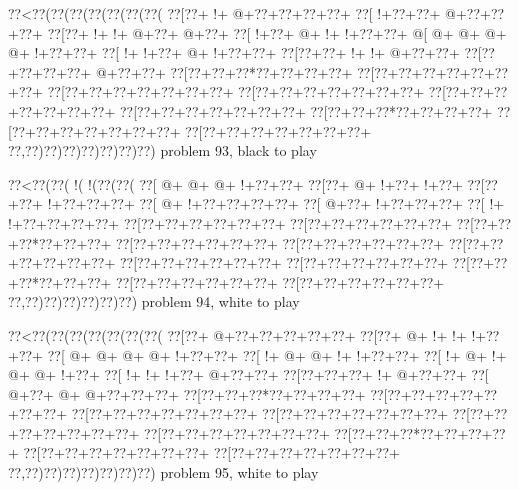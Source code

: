 \vbox{\vbox{\goo
\0??<\0??(\0??(\0??(\0??(\0??(\0??(\0??(
\0??[\0??+\- !+\- @+\0??+\0??+\0??+\0??+
\0??[\- !+\0??+\0??+\- @+\0??+\0??+\0??+
\0??[\0??+\- !+\- !+\- @+\0??+\- @+\0??+
\0??[\- !+\0??+\- @+\- !+\- !+\0??+\0??+
\- @[\- @+\- @+\- @+\- @+\- !+\0??+\0??+
\0??[\- !+\- !+\0??+\- @+\- !+\0??+\0??+
\0??[\0??+\0??+\- !+\- !+\- @+\0??+\0??+
\0??[\0??+\0??+\0??+\0??+\- @+\0??+\0??+
\0??[\0??+\0??+\0??*\0??+\0??+\0??+\0??+
\0??[\0??+\0??+\0??+\0??+\0??+\0??+\0??+
\0??[\0??+\0??+\0??+\0??+\0??+\0??+\0??+
\0??[\0??+\0??+\0??+\0??+\0??+\0??+\0??+
\0??[\0??+\0??+\0??+\0??+\0??+\0??+\0??+
\0??[\0??+\0??+\0??+\0??+\0??+\0??+\0??+
\0??[\0??+\0??+\0??*\0??+\0??+\0??+\0??+
\0??[\0??+\0??+\0??+\0??+\0??+\0??+\0??+
\0??[\0??+\0??+\0??+\0??+\0??+\0??+\0??+
\0??,\0??)\0??)\0??)\0??)\0??)\0??)\0??)
}
\hfil problem 93, black to play\hfil\break
}

\vbox{\vbox{\goo
\0??<\0??(\0??(\- !(\- !(\0??(\0??(
\0??[\- @+\- @+\- @+\- !+\0??+\0??+
\0??[\0??+\- @+\- !+\0??+\- !+\0??+
\0??[\0??+\0??+\- !+\0??+\0??+\0??+
\0??[\- @+\- !+\0??+\0??+\0??+\0??+
\0??[\- @+\0??+\- !+\0??+\0??+\0??+
\0??[\- !+\- !+\0??+\0??+\0??+\0??+
\0??[\0??+\0??+\0??+\0??+\0??+\0??+
\0??[\0??+\0??+\0??+\0??+\0??+\0??+
\0??[\0??+\0??+\0??*\0??+\0??+\0??+
\0??[\0??+\0??+\0??+\0??+\0??+\0??+
\0??[\0??+\0??+\0??+\0??+\0??+\0??+
\0??[\0??+\0??+\0??+\0??+\0??+\0??+
\0??[\0??+\0??+\0??+\0??+\0??+\0??+
\0??[\0??+\0??+\0??+\0??+\0??+\0??+
\0??[\0??+\0??+\0??*\0??+\0??+\0??+
\0??[\0??+\0??+\0??+\0??+\0??+\0??+
\0??[\0??+\0??+\0??+\0??+\0??+\0??+
\0??,\0??)\0??)\0??)\0??)\0??)\0??)
}
\hfil problem 94, white to play\hfil\break
}

\vbox{\vbox{\goo
\0??<\0??(\0??(\0??(\0??(\0??(\0??(\0??(
\0??[\0??+\- @+\0??+\0??+\0??+\0??+\0??+
\0??[\0??+\- @+\- !+\- !+\- !+\0??+\0??+
\0??[\- @+\- @+\- @+\- @+\- !+\0??+\0??+
\0??[\- !+\- @+\- @+\- !+\- !+\0??+\0??+
\0??[\- !+\- @+\- !+\- @+\- @+\- !+\0??+
\0??[\- !+\- !+\- !+\0??+\- @+\0??+\0??+
\0??[\0??+\0??+\0??+\- !+\- @+\0??+\0??+
\0??[\- @+\0??+\- @+\- @+\0??+\0??+\0??+
\0??[\0??+\0??+\0??*\0??+\0??+\0??+\0??+
\0??[\0??+\0??+\0??+\0??+\0??+\0??+\0??+
\0??[\0??+\0??+\0??+\0??+\0??+\0??+\0??+
\0??[\0??+\0??+\0??+\0??+\0??+\0??+\0??+
\0??[\0??+\0??+\0??+\0??+\0??+\0??+\0??+
\0??[\0??+\0??+\0??+\0??+\0??+\0??+\0??+
\0??[\0??+\0??+\0??*\0??+\0??+\0??+\0??+
\0??[\0??+\0??+\0??+\0??+\0??+\0??+\0??+
\0??[\0??+\0??+\0??+\0??+\0??+\0??+\0??+
\0??,\0??)\0??)\0??)\0??)\0??)\0??)\0??)
}
\hfil problem 95, white to play\hfil\break
}

